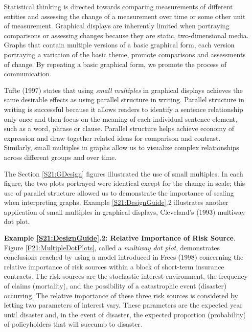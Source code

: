 Statistical thinking is directed towards comparing measurements of
different entities and assessing the change of a measurement over
time or some other unit of measurement. Graphical displays are
inherently limited when portraying comparisons or assessing changes
because they are static, two-dimensional media. Graphs that contain
multiple versions of a basic graphical form, each version portraying
a variation of the basic theme, promote comparisons and assessments
of change. By repeating a basic graphical form, we promote the
process of communication.

Tufte (1997) states that using \emph{small multiples} in graphical
displays achieves the same desirable effects as using parallel
structure in writing. Parallel structure in writing is successful
because it allows readers to identify a sentence relationship only
once and then focus on the meaning of each individual sentence
element, such as a word, phrase or clause. Parallel structure helps
achieve economy of expression and draw together related ideas for
comparison and contrast. Similarly, small multiples in graphs allow
us to visualize complex relationships across different groups and
over time.


The Section \ref{S21:GDesign} figures illustrated the use of small
multiples. In each figure, the two plots portrayed were identical
except for the change in scale; this use of parallel structure
allowed us to demonstrate the importance of scaling when
interpreting graphs. Example \ref{S21:DesignGuide}.2 illustrates
another application of small multiples in graphical displays,
Cleveland's (1993) multiway dot plot.

\linejed

\textbf{Example \ref{S21:DesignGuide}.2: Relative Importance of Risk
Source}. Figure \ref{F21:MultipleDotPlots}, called a \emph{multiway
dot plot}, demonstrates conclusions reached by using a model
introduced in Frees (1998) concerning the relative importance of
risk sources within a block of short-term insurance contracts. The
risk sources are the stochastic interest environment, the frequency
of claims (mortality), and the possibility of a catastrophic event
(disaster) occurring. The relative importance of these three risk
sources is considered by letting two parameters of interest vary.
These parameters are the expected year until disaster and, in the
event of disaster, the expected proportion (probability) of
policyholders that will succumb to disaster.

